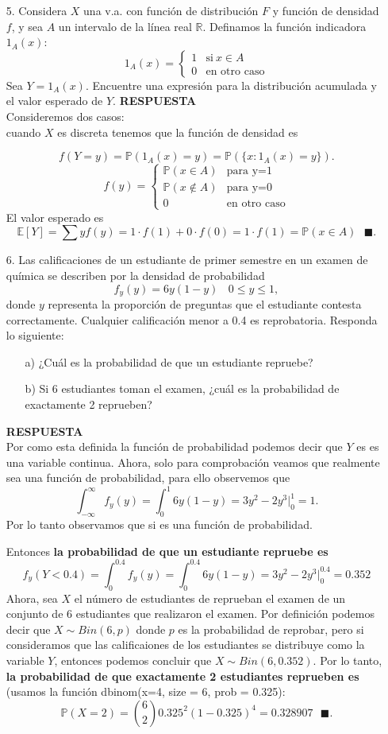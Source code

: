 \documentclass[11pt,letterpaper]{article}
\newcommand{\mP}{\mathbb{P}}
\newcommand{\mE}{\mathbb{E}}
\newcommand{\res}{\textbf{RESPUESTA}\\}
\newcommand{\finf}{\blacksquare.}
\begin{document}
\begin{itemize}
\item[5.] Considera $X$ una v.a. con función de distribución $F$ y función de densidad $f$, y sea $A$ un intervalo de la línea real $\mathbb{R}$. Definamos la función indicadora $1_{A}(x):$
\begin{equation*}
1_{A}(x) = \left\{\begin{array}{ccr}
1 & \text{si} \ x\in A\\
0 & \text{en otro caso}
\end{array}\right.
\end{equation*}
Sea $Y=1_{A}(x).$ Encuentre una expresión para la distribución acumulada y el valor esperado de $Y$. 
\res 
Consideremos dos casos:\\
cuando $X$ es discreta tenemos que la función de densidad es 

$$f(Y=y)=\mP(1_{A}(x)=y)=\mP(\{x:1_{A}(x)=y\}).$$
\begin{equation*}
f(y)=\left\{ \begin{array}{cc}
\mP(x\in A) & \text{para y=1}\\
\mP(x\not \in A) & \text{para y=0}\\
0 & \text{en otro caso}
\end{array}\right.
\end{equation*}
El valor esperado es
$$\mE[Y]=\sum y f(y)=1\cdot f(1)+0\cdot f(0)=1\cdot f(1)=\mP(x\in A)\ \ \ \finf$$

\item[6.] Las calificaciones de un estudiante de primer semestre en un examen de química se describen
por la densidad de probabilidad
$$f_y(y)=6y(1-y)\ \ \ \ 0\leq y \leq 1,$$
donde $y$ representa la proporción de preguntas que el estudiante contesta correctamente. Cualquier calificación menor a 0.4 es reprobatoria. Responda lo siguiente:
\begin{itemize}
\item[a)] ¿Cuál es la probabilidad de que un estudiante repruebe?
\item[b)] Si 6 estudiantes toman el examen, ¿cuál es la probabilidad de exactamente 2 reprueben?
\end{itemize}
\res
Por como esta definida la función de probabilidad podemos decir que $Y$ es es una variable continua. Ahora, solo para comprobación veamos que realmente sea una función de probabilidad, para ello observemos que
$$\int_{-\infty}^\infty f_y(y)=\int_{0}^1 6y(1-y)=3y^2-2y^3|_0^1=1.$$
Por lo tanto observamos que si es una función de probabilidad. 

Entonces \textbf{la probabilidad de que un estudiante repruebe es}
$$f_y(Y<0.4)=\int_0^{0.4}f_y(y)=\int_0^{0.4} 6y(1-y)=3y^2-2y^3|_0^{0.4}=0.352 $$
Ahora, sea $X$ el número de estudiantes de reprueban el examen de un conjunto de 6 estudiantes que realizaron el examen. Por definición podemos decir que $X\sim Bin(6,p)$ donde $p$ es la probabilidad de reprobar, pero si consideramos que las calificaiones de los estudiantes se distribuye como la variable $Y$, entonces podemos concluir que $X\sim Bin(6,0.352).$  Por lo tanto, \textbf{la probabilidad de que exactamente 2 estudiantes reprueben es} (usamos la función dbinom(x=4, size = 6, prob = 0.325):
$$\mP(X=2)={6\choose 2}0.325^2(1-0.325)^4 =0.328907 \ \ \ \finf$$


\end{itemize}
\end{document}
